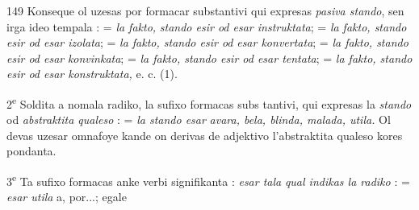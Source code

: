 \begin{VUpage}[153]{149}
Konseque ol uzesas por formacar substantivi qui expresas\nl
\textit{pasiva stando}, sen irga ideo tempala :  = \textit{la fakto,}\nl
\textit{stando esir od esar instruktata};  = \textit{la fakto, stando}\nl
\textit{esir od esar izolata};  = \textit{la fakto, stando esir od}\nl
\textit{esar konvertata};  = \textit{la fakto, stando esir od esar}\nl
\textit{konvinkata};  = \textit{la fakto, stando esir od esar tentata};\nl
{} = \textit{la fakto, stando esir od esar konstruktata,}\nl
e. c. (1).

2\textsuperscript{e} Soldita a nomala radiko, la sufixo  formacas subs\cc
tantivi, qui expresas la \textit{stando} od \textit{abstraktita qualeso} : \cc
{} = \textit{la stando esar}\nl
\textit{avara, bela, blinda, malada, utila.} Ol devas uzesar omnafoye\nl
kande on derivas de adjektivo l'abstraktita qualeso kores\cc
pondanta.

3\textsuperscript{e} Ta sufixo formacas anke verbi signifikanta : \textit{esar tala}\nl
\textit{qual indikas la radiko} :  = \textit{esar utila} a, por...; egale\cc
\end{VUpage}

